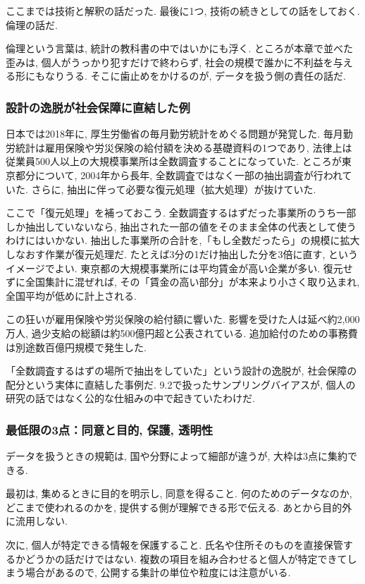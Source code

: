 ここまでは技術と解釈の話だった.
最後に1つ, 技術の続きとしての話をしておく. 倫理の話だ.

倫理という言葉は, 統計の教科書の中ではいかにも浮く.
ところが本章で並べた歪みは, 個人がうっかり犯すだけで終わらず, 社会の規模で誰かに不利益を与える形にもなりうる.
そこに歯止めをかけるのが, データを扱う側の責任の話だ.

\subsubsection*{設計の逸脱が社会保障に直結した例}

日本では2018年に, 厚生労働省の毎月勤労統計をめぐる問題が発覚した.
毎月勤労統計は雇用保険や労災保険の給付額を決める基礎資料の1つであり, 法律上は従業員500人以上の大規模事業所は全数調査することになっていた.
ところが東京都分について, 2004年から長年, 全数調査ではなく一部の抽出調査が行われていた.
さらに, 抽出に伴って必要な復元処理（拡大処理）が抜けていた.

ここで「復元処理」を補っておこう.
全数調査するはずだった事業所のうち一部しか抽出していないなら, 抽出された一部の値をそのまま全体の代表として使うわけにはいかない.
抽出した事業所の合計を,「もし全数だったら」の規模に拡大しなおす作業が復元処理だ.
たとえば3分の1だけ抽出した分を3倍に直す, というイメージでよい.
東京都の大規模事業所には平均賃金が高い企業が多い. 復元せずに全国集計に混ぜれば, その「賃金の高い部分」が本来より小さく取り込まれ, 全国平均が低めに計上される.

この狂いが雇用保険や労災保険の給付額に響いた.
影響を受けた人は延べ約2{,}000万人, 過少支給の総額は約500億円超と公表されている.
追加給付のための事務費は別途数百億円規模で発生した.

「全数調査するはずの場所で抽出をしていた」という設計の逸脱が, 社会保障の配分という実体に直結した事例だ.
9.2で扱ったサンプリングバイアスが, 個人の研究の話ではなく公的な仕組みの中で起きていたわけだ.

\subsubsection*{最低限の3点：同意と目的, 保護, 透明性}

データを扱うときの規範は, 国や分野によって細部が違うが, 大枠は3点に集約できる.

最初は, 集めるときに目的を明示し, 同意を得ること.
何のためのデータなのか, どこまで使われるのかを, 提供する側が理解できる形で伝える.
あとから目的外に流用しない.

次に, 個人が特定できる情報を保護すること.
氏名や住所そのものを直接保管するかどうかの話だけではない.
複数の項目を組み合わせると個人が特定できてしまう場合があるので, 公開する集計の単位や粒度には注意がいる.

